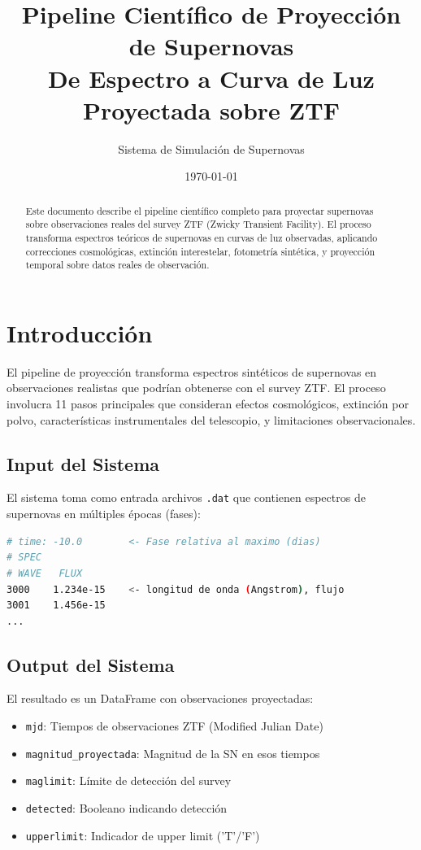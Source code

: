 \documentclass[11pt,a4paper]{article}
\title{\textbf{Pipeline Científico de Proyección de Supernovas} \\ 
       \large De Espectro a Curva de Luz Proyectada sobre ZTF}
\author{Sistema de Simulación de Supernovas}
\date{\today}
\begin{document}
\maketitle

\begin{abstract}
Este documento describe el pipeline científico completo para proyectar supernovas sobre observaciones reales del survey ZTF (Zwicky Transient Facility). El proceso transforma espectros teóricos de supernovas en curvas de luz observadas, aplicando correcciones cosmológicas, extinción interestelar, fotometría sintética, y proyección temporal sobre datos reales de observación.
\end{abstract}

\tableofcontents
\newpage

\section{Introducción}

El pipeline de proyección transforma espectros sintéticos de supernovas en observaciones realistas que podrían obtenerse con el survey ZTF. El proceso involucra 11 pasos principales que consideran efectos cosmológicos, extinción por polvo, características instrumentales del telescopio, y limitaciones observacionales.

\subsection{Input del Sistema}

El sistema toma como entrada archivos \texttt{.dat} que contienen espectros de supernovas en múltiples épocas (fases):

\begin{lstlisting}[language=bash, caption=Formato de archivo de espectro]
# time: -10.0        <- Fase relativa al maximo (dias)
# SPEC
# WAVE   FLUX
3000    1.234e-15    <- longitud de onda (Angstrom), flujo
3001    1.456e-15
...
\end{lstlisting}

\subsection{Output del Sistema}

El resultado es un DataFrame con observaciones proyectadas:
\begin{itemize}
    \item \texttt{mjd}: Tiempos de observaciones ZTF (Modified Julian Date)
    \item \texttt{magnitud\_proyectada}: Magnitud de la SN en esos tiempos
    \item \texttt{maglimit}: Límite de detección del survey
    \item \texttt{detected}: Booleano indicando detección
    \item \texttt{upperlimit}: Indicador de upper limit ('T'/'F')
\end{itemize}
\end{document}
